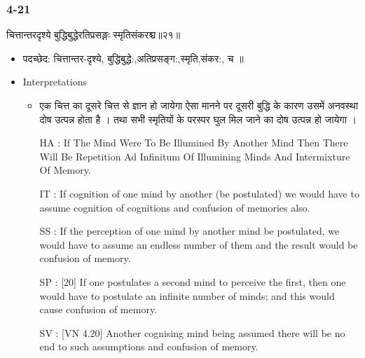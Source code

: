 \begin{frame}[fragile]\frametitle{4-21}
\begin{sanskrit}
चित्तान्तरदृश्ये बुद्धिबुद्धेरतिप्रसङ्गः स्मृतिसंकरश्च॥२१॥
\end{sanskrit}

	\begin{itemize}
	\item पदच्छेद:  ‌चित्तान्तर-दृश्ये, बुद्धिबुद्धे:,अतिप्रसङ्ग:,स्मृति,संकर:, च ‌॥
	\item Interpretations
		\begin{itemize}	
		\item एक चित्त का दूसरे चित्त से ज्ञान हो जायेगा ऐसा मानने पर दूसरी बुद्धि के कारण उसमें अनवस्था दोष उत्पन्न होता है । तथा सभी स्मृतियों के परस्पर घुल मिल जाने का दोष उत्पन्न हो जायेगा ।
		\item [HA]: If The Mind Were To Be Illumined By Another Mind Then There Will Be Repetition Ad Infinitum Of Illumining Minds And Intermixture Of Memory.
		\item [IT]: If cognition of one mind by another (be postulated) we would have to assume cognition of cognitions and confusion of memories also.
		\item [SS]: If the perception of one mind by another mind be postulated, we would have to assume an endless number of them and the result would be confusion of memory.
		\item [SP]: [20] If one postulates a second mind to perceive the first, then one would have to postulate an infinite number of minds; and this would cause confusion of memory.
		\item [SV]: [VN 4.20] Another cognising mind being assumed there will be no end to such assumptions and confusion of memory. 
		\end{itemize}
	\end{itemize}
\end{frame}


